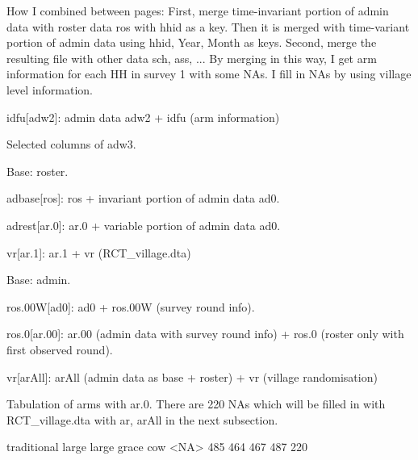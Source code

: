 How I combined between pages: First, merge time-invariant portion of admin data with roster data \textsf{ros} with \textsf{hhid} as a key. Then it is merged with time-variant portion of admin data using \textsf{hhid, Year, Month} as keys. %
Second, merge the resulting file with other data \textsf{sch}, \textsf{ass}, ... By merging in this way, I get arm information for each HH in survey 1 with some NAs. I fill in NAs by using village level information.

\begin{description}
\vspace{1.0ex}\setlength{\itemsep}{1.0ex}\setlength{\baselineskip}{12pt}
\item[adw3]	idfu[adw2]: admin data \textsf{adw2} + \textsf{idfu} (arm information)
\item[ad0]	Selected columns of adw3.
\end{description}
Base: roster.
\begin{description}
\vspace{1.0ex}\setlength{\itemsep}{1.0ex}\setlength{\baselineskip}{12pt}
\item[ar.0]	adbase[ros]: \textsf{ros} + invariant portion of admin data \textsf{ad0}.
\item[ar.1]	adrest[ar.0]: \textsf{ar.0} + variable portion of admin data \textsf{ad0}.
\item[ar] vr[ar.1]: \textsf{ar.1} + \textsf{vr} (RCT\_village.dta)
\end{description}
Base: admin.
\begin{description}
\vspace{1.0ex}\setlength{\itemsep}{1.0ex}\setlength{\baselineskip}{12pt}
\item[ar.00]	ros.00W[ad0]: \textsf{ad0} + \textsf{ros.00W} (survey round info).
\item[arAll]	ros.0[ar.00]: \textsf{ar.00} (admin data with survey round info) + \textsf{ros.0} (roster only with first observed round).
\item[arA] vr[arAll]: \textsf{arAll} (admin data as base + roster) + \textsf{vr} (village randomisation)
\end{description}

Tabulation of arms with \textsf{ar.0}. There are 220 NAs which will be filled in with \textsf{RCT\_village.dta} with \textsf{ar, arAll} in the next subsection.
\begin{Schunk}
\begin{Soutput}

traditional       large large grace         cow        <NA> 
        485         464         467         487         220 
\end{Soutput}
\end{Schunk}



